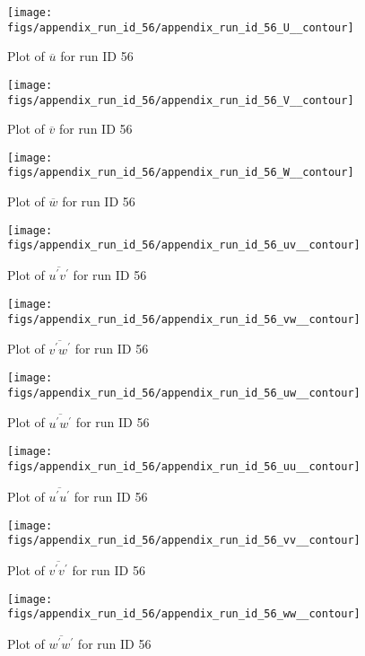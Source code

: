 \begin{figure}[H]
\centering
\texttt{[image: figs/appendix\_run\_id\_56/appendix\_run\_id\_56\_U\_\_contour]}
\caption{Plot of $\overline{u}$ for run ID 56}
\label{fig:appendix_run_id_56_U__contour}
\end{figure}


\begin{figure}[H]
\centering
\texttt{[image: figs/appendix\_run\_id\_56/appendix\_run\_id\_56\_V\_\_contour]}
\caption{Plot of $\overline{v}$ for run ID 56}
\label{fig:appendix_run_id_56_V__contour}
\end{figure}


\begin{figure}[H]
\centering
\texttt{[image: figs/appendix\_run\_id\_56/appendix\_run\_id\_56\_W\_\_contour]}
\caption{Plot of $\overline{w}$ for run ID 56}
\label{fig:appendix_run_id_56_W__contour}
\end{figure}


\begin{figure}[H]
\centering
\texttt{[image: figs/appendix\_run\_id\_56/appendix\_run\_id\_56\_uv\_\_contour]}
\caption{Plot of $\overline{u^\prime v^\prime}$ for run ID 56}
\label{fig:appendix_run_id_56_uv__contour}
\end{figure}


\begin{figure}[H]
\centering
\texttt{[image: figs/appendix\_run\_id\_56/appendix\_run\_id\_56\_vw\_\_contour]}
\caption{Plot of $\overline{v^\prime w^\prime}$ for run ID 56}
\label{fig:appendix_run_id_56_vw__contour}
\end{figure}


\begin{figure}[H]
\centering
\texttt{[image: figs/appendix\_run\_id\_56/appendix\_run\_id\_56\_uw\_\_contour]}
\caption{Plot of $\overline{u^\prime w^\prime}$ for run ID 56}
\label{fig:appendix_run_id_56_uw__contour}
\end{figure}


\begin{figure}[H]
\centering
\texttt{[image: figs/appendix\_run\_id\_56/appendix\_run\_id\_56\_uu\_\_contour]}
\caption{Plot of $\overline{u^\prime u^\prime}$ for run ID 56}
\label{fig:appendix_run_id_56_uu__contour}
\end{figure}


\begin{figure}[H]
\centering
\texttt{[image: figs/appendix\_run\_id\_56/appendix\_run\_id\_56\_vv\_\_contour]}
\caption{Plot of $\overline{v^\prime v^\prime}$ for run ID 56}
\label{fig:appendix_run_id_56_vv__contour}
\end{figure}


\begin{figure}[H]
\centering
\texttt{[image: figs/appendix\_run\_id\_56/appendix\_run\_id\_56\_ww\_\_contour]}
\caption{Plot of $\overline{w^\prime w^\prime}$ for run ID 56}
\label{fig:appendix_run_id_56_ww__contour}
\end{figure}


